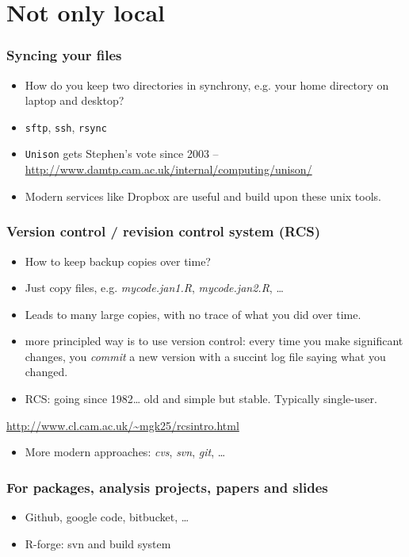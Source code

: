 \documentclass{beamer}
\begin{document}
\section{Not only local}
\label{sec-3}
\begin{frame}
\frametitle{Syncing your files}
\label{sec-3-1}


\begin{itemize}
\item How do you keep two directories in synchrony, e.g. your home
  directory on laptop and desktop?
\item \texttt{sftp}, \texttt{ssh}, \texttt{rsync}
\item \texttt{Unison} gets Stephen's vote since 2003 -- \href{http://www.damtp.cam.ac.uk/internal/computing/unison/}{http://www.damtp.cam.ac.uk/internal/computing/unison/}
\item Modern services like Dropbox are useful and build upon these unix
  tools.
\end{itemize}
\end{frame}
\begin{frame}
\frametitle{Version control / revision control system (RCS)}
\label{sec-3-2}


\begin{itemize}
\item How to keep backup copies over time?
\item Just copy files, e.g. \emph{mycode.jan1.R}, \emph{mycode.jan2.R}, \ldots{}
\item Leads to many large copies, with no trace of what you did over time.
\item more principled way is to use version control: every time you make
  significant changes, you \emph{commit} a new version with a succint log
  file saying what you changed.
\item RCS: going since 1982\ldots{} old and simple but stable.  Typically
  single-user.
\end{itemize}
\url{http://www.cl.cam.ac.uk/~mgk25/rcsintro.html}

\begin{itemize}
\item More modern approaches: \emph{cvs}, \emph{svn}, \emph{git}, \ldots{}
\end{itemize}
\end{frame}
\begin{frame}
\frametitle{For packages, analysis projects, papers and slides}
\label{sec-3-3}

\begin{itemize}
\item Github, google code, bitbucket, \ldots{}
\item R-forge: svn and build system
\end{itemize}
\end{frame}
\end{document}
